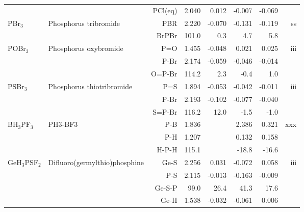 \begin{table}
\begin{center}
\begin{tabular}{llrrrrrr}
             &                                    &PCl(eq)        &     2.040   &     0.012 &    -0.007 &    -0.069 &       \\
 PBr$_3$        & Phosphorus tribromide              &PBR            &     2.220   &    -0.070 &    -0.131 &    -0.119 &    ss \\
             &                                    &BrPBr        &     101.0   &       0.3 &       4.7 &       5.8   &       \\
 POBr$_3$       & Phosphorus oxybromide              &P=O            &     1.455   &    -0.048 &     0.021 &     0.025 &   iii \\
             &                                    &P-Br           &     2.174   &    -0.059 &    -0.046 &    -0.014 &       \\
             &                                    &O=P-Br       &     114.2   &       2.3 &      -0.4 &       1.0   &       \\
 PSBr$_3$       & Phosphorus thiotribromide          &P=S            &     1.894   &    -0.053 &    -0.042 &    -0.011 &   iii \\
             &                                    &P-Br           &     2.193   &    -0.102 &    -0.077 &    -0.040 &       \\
             &                                    &S=P-Br       &     116.2   &      12.0 &      -1.5 &      -1.0   &       \\
 BH$_3$PF$_3$      & PH3-BF3                            &P-B           &     1.836   &  &     2.386 &     0.321 &   xxx \\
             &                                    &P-H           &     1.207   &  &     0.132 &     0.158 &       \\
             &                                    &H-P-H       &     115.1   &  &     -18.8 &     -16.6   &       \\
 GeH$_3$PSF$_2$    & Difluoro(germylthio)phosphine      &Ge-S           &     2.256   &     0.031 &    -0.072 &     0.058 &   iii \\
             &                                    &P-S            &     2.115   &    -0.013 &    -0.163 &    -0.009 &       \\
             &                                    &Ge-S-P       &      99.0   &      26.4 &      41.3 &      17.6   &       \\
             &                                    &Ge-H           &     1.538   &    -0.032 &    -0.061 &     0.006 &       \\

\end{tabular}
\end{center}
\end{table}
